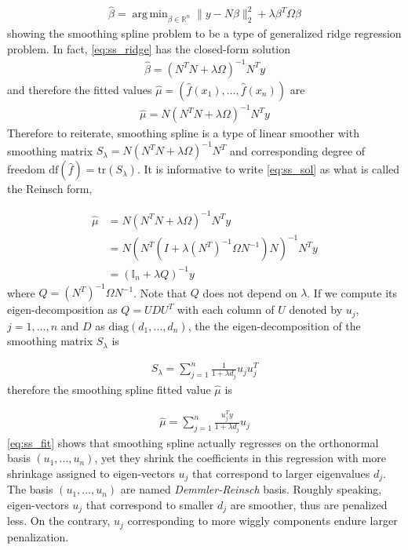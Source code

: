 \documentclass[a4paper]{article}
\DeclareMathOperator*{\argmin}{arg\,min}
\newcommand{\RR}{\mathbb{R}}
\begin{document}
\begin{align}
\hat{\beta} = \argmin_{\beta\in\RR^n} \|y-N\beta\|_2^2 + \lambda\beta^T\Omega\beta
\label{eq:ss_ridge}
\end{align}
showing the smoothing spline problem to be a type of generalized ridge regression problem. In fact, \eqref{eq:ss_ridge} has the closed-form solution
\begin{align}
\hat{\beta} = (N^TN + \lambda\Omega)^{-1}N^Ty
\end{align}
and therefore the fitted values $\hat{\mu} = (\hat{f}(x_1),\ldots, \hat{f}(x_n))$ are
\begin{align}
\hat{\mu} = N(N^TN + \lambda\Omega)^{-1}N^Ty
\label{eq:ss_sol}
\end{align}
Therefore to reiterate, smoothing spline is a type of linear smoother with smoothing matrix $S_\lambda = N(N^TN + \lambda\Omega)^{-1}N^T$ and corresponding degree of freedom $\mbox{df}(\hat{f}) = \mbox{tr}(S_\lambda)$. It is informative to write \eqref{eq:ss_sol} as what is called the Reinsch form,

\begin{equation}
\begin{aligned}
\hat{\mu} &= N(N^TN + \lambda\Omega)^{-1}N^Ty\\
&= N(N^T(I + \lambda (N^T)^{-1}\Omega N^{-1})N)^{-1}N^Ty\\
&= (\mathbb{I}_n + \lambda Q)^{-1}y
\end{aligned}
\label{eq:ss_reinsch}
\end{equation}
where $Q =(N^T)^{-1}\Omega N^{-1}$. Note that $Q$ does not depend on $\lambda$. If we compute its eigen-decomposition as $Q = UDU^T$ with each column of $U$ denoted by $u_j$, $j=1,\ldots, n$ and $D$ as $\mbox{diag}(d_1,\ldots, d_n)$, the the eigen-decomposition of the smoothing matrix $S_\lambda$ is 

\begin{align*}
S_\lambda = \sum_{j=1}^n \frac{1}{1+\lambda d_j}u_ju_j^T
\end{align*}
therefore the smoothing spline fitted value $\hat{\mu}$ is 

\begin{align}
\hat{\mu} = \sum_{j=1}^n \frac{u_j^Ty}{1+\lambda d_j}u_j
\label{eq:ss_fit}
\end{align}
\eqref{eq:ss_fit} shows that smoothing spline actually regresses on the orthonormal basis $(u_1,\ldots, u_n)$, yet they shrink the coefficients in this regression with more shrinkage assigned to eigen-vectors $u_j$ that correspond to larger eigenvalues $d_j$. The basis $(u_1,\ldots, u_n)$ are named \textit{Demmler-Reinsch} basis\cite{demmler1975oscillation}. Roughly speaking, eigen-vectors $u_j$ that correspond to smaller $d_j$ are smoother, thus are penalized less. On the contrary, $u_j$ corresponding to more wiggly components endure larger penalization. 
\end{document}
